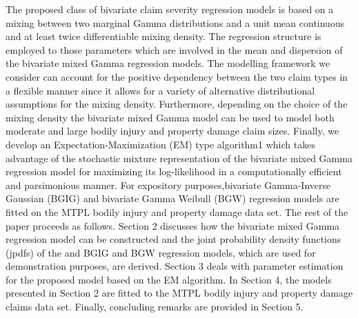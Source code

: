 \documentclass[12pt]{article}%
\theoremstyle{definition}
\theoremstyle{remark}
\begin{document}
	 The proposed class of bivariate 
	claim severity regression models is based on a mixing between two marginal Gamma 
	distributions and a unit mean continuous and at least twice differentiable mixing density. The regression structure is employed to those parameters which are involved in the mean and dispersion of the bivariate mixed Gamma regression models. 
	The modelling framework we consider can account for the positive dependency between the 
	two claim types in a flexible manner since it allows for a variety of alternative distributional 
	assumptions for the mixing density. Furthermore, depending on the choice of the mixing 
	density the bivariate mixed Gamma model can be used to model both moderate and 
	large bodily injury and property damage claim sizes. Finally, we develop an Expectation-Maximization (EM) type algorithm1 which 
	takes advantage of the stochastic mixture representation of the bivariate mixed Gamma 
	regression model for maximizing its log-likelihood in a computationally efficient and 
	parsimonious manner. For expository purposes,bivariate Gamma-Inverse Gaussian (BGIG) and bivariate Gamma Weibull (BGW) regression models are 
	fitted on the MTPL bodily injury and property damage data set. 
	The rest of the paper proceeds as follows. Section 2 discusses how the bivariate mixed 
	Gamma regression model can be constructed and the joint probability density functions 
	(jpdfs) of the and BGIG and BGW regression models, which are used for demonstration purposes, 
	are derived. Section 3 deals with parameter estimation for the proposed model based on the 
	EM algorithm. In Section 4, the models presented in Section 2 are fitted to the MTPL bodily 
	injury and property damage claims data set. Finally, concluding remarks are provided in 
	Section 5.
	\pagebreak
	
\end{document}
